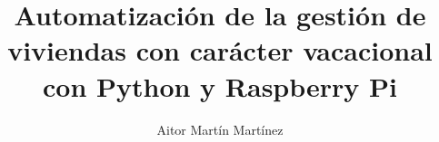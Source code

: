 
\title{Automatización de la gestión de viviendas con carácter vacacional con Python y Raspberry Pi}
\author{Aitor Martín Martínez}










\address{UCLM --- Escuela de Ingeniería Industrial y Aeroespacial\\
    Campus Universitario de la Real Fábrica de Armas}
